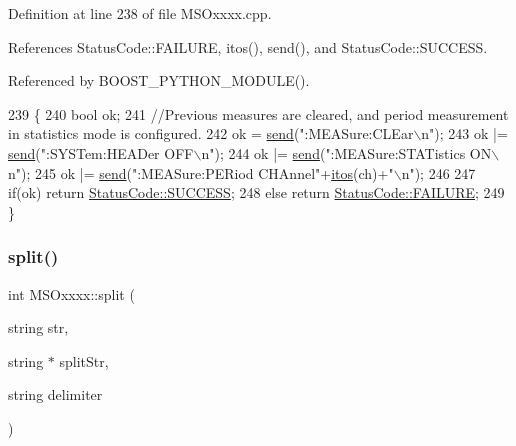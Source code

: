Definition at line 238 of file M\+S\+Oxxxx.\+cpp.



References Status\+Code\+::\+F\+A\+I\+L\+U\+RE, itos(), send(), and Status\+Code\+::\+S\+U\+C\+C\+E\+SS.



Referenced by B\+O\+O\+S\+T\+\_\+\+P\+Y\+T\+H\+O\+N\+\_\+\+M\+O\+D\+U\+L\+E().


\begin{DoxyCode}
239 \{   
240     \textcolor{keywordtype}{bool} ok;
241     \textcolor{comment}{//Previous measures are cleared, and period measurement in statistics mode is configured.}
242     ok  = \hyperlink{classMSOxxxx_ae77668a1ae4ccb74e0ed5f2485dfdebf}{send}(\textcolor{stringliteral}{":MEASure:CLEar\(\backslash\)n"});
243     ok |= \hyperlink{classMSOxxxx_ae77668a1ae4ccb74e0ed5f2485dfdebf}{send}(\textcolor{stringliteral}{":SYSTem:HEADer OFF\(\backslash\)n"});    
244     ok |= \hyperlink{classMSOxxxx_ae77668a1ae4ccb74e0ed5f2485dfdebf}{send}(\textcolor{stringliteral}{":MEASure:STATistics ON\(\backslash\)n"});
245     ok |= \hyperlink{classMSOxxxx_ae77668a1ae4ccb74e0ed5f2485dfdebf}{send}(\textcolor{stringliteral}{":MEASure:PERiod CHAnnel"}+\hyperlink{Tools_8h_af330027dbdafb9a30768b3613c553e60}{itos}(ch)+\textcolor{stringliteral}{"\(\backslash\)n"});
246 
247     \textcolor{keywordflow}{if}(ok)  \textcolor{keywordflow}{return} \hyperlink{classStatusCode_a6f565cbeadc76d14c72f047e5e85eb4badd0da38d3ba0d922efd1f4619bc37ad8}{StatusCode::SUCCESS};
248     \textcolor{keywordflow}{else}        \textcolor{keywordflow}{return} \hyperlink{classStatusCode_a6f565cbeadc76d14c72f047e5e85eb4ba3da73d4c469762eb9d3c960368252b26}{StatusCode::FAILURE};  
249 \}
\end{DoxyCode}
\mbox{\label{classMSOxxxx_a46726c6d181a758bb4f598c66f336236}} 
\subsubsection{\texorpdfstring{split()}{split()}}
{\footnotesize\ttfamily int M\+S\+Oxxxx\+::split (\begin{DoxyParamCaption}\item[{string}]{str,  }\item[{string $\ast$}]{split\+Str,  }\item[{string}]{delimiter }\end{DoxyParamCaption})\hspace{0.3cm}{\ttfamily [private]}}



